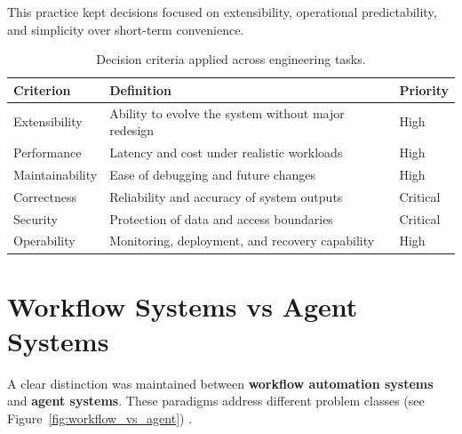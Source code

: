 This practice kept decisions focused on extensibility, operational
predictability, and simplicity over short-term convenience.

\begin{table}[htbp]
    \centering
    \captionsetup{font=normalsize}
    \footnotesize
    \label{tab:DecisionCriteria}
    \begin{tabularx}{\textwidth}{|p{2.6cm}|X|p{1.8cm}|}
        \hline
        \textbf{Criterion} & \textbf{Definition}                                 & \textbf{Priority} \\
        \hline
        Extensibility      & Ability to evolve the system without major redesign & High              \\
        \hline
        Performance        & Latency and cost under realistic workloads          & High              \\
        \hline
        Maintainability    & Ease of debugging and future changes                & High              \\
        \hline
        Correctness        & Reliability and accuracy of system outputs          & Critical          \\
        \hline
        Security           & Protection of data and access boundaries            & Critical          \\
        \hline
        Operability        & Monitoring, deployment, and recovery capability     & High              \\
        \hline
    \end{tabularx}
    \caption{Decision criteria applied across engineering tasks.}
\end{table}

\clearpage

\section{Workflow Systems vs Agent Systems}
\label{sec:WorkflowVsAgent}

A clear distinction was maintained between \textbf{workflow automation systems}
and \textbf{agent systems}. These paradigms address different problem classes
(see Figure~\ref{fig:workflow_vs_agent}) \cite{googleSRE,openaiPrompting}.

